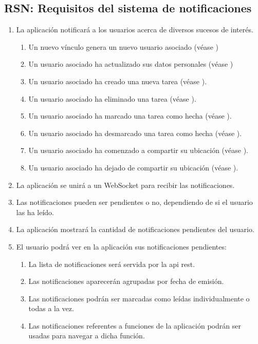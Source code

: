 \subsection{RSN: Requisitos del sistema de notificaciones}

\begin{enumerate}[label*=RSN \arabic*.]
    \item \label{req:notificaciones} La aplicación notificará a los usuarios acerca de diversos sucesos de interés.
    \begin{enumerate}[label*=\arabic*.]
        \item Un nuevo vínculo genera un nuevo usuario asociado (véase )
        \item Un usuario asociado ha actualizado sus datos personales (véase )
        \item Un usuario asociado ha creado una nueva tarea (véase ).
        \item Un usuario asociado ha eliminado una tarea (véase ).
        \item Un usuario asociado ha marcado una tarea como hecha (véase ).
        \item Un usuario asociado ha desmarcado una tarea como hecha (véase ).
        \item Un usuario asociado ha comenzado a compartir su ubicación (véase ).
        \item Un usuario asociado ha dejado de compartir su ubicación (véase ).
    \end{enumerate}
    \item La aplicación se unirá a un WebSocket para recibir las notificaciones.
    \item Las notificaciones pueden ser pendientes o no, dependiendo de si el usuario las ha leído.
    \item La aplicación mostrará la cantidad de notificaciones pendientes del usuario.
    \item \label{req:consultar_notificaciones} El usuario podrá ver en la aplicación sus notificaciones pendientes:
    \begin{enumerate}[label*=\arabic*.]
        \item La lista de notificaciones será servida por la \acrshort{api} \acrshort{rest}.
        \item Las notificaciones aparecerán agrupadas por fecha de emisión.
        \item \label{req:leer_notificaciones} Las notificaciones podrán ser marcadas como leídas individualmente o todas a la vez.
        \item Las notificaciones referentes a funciones de la aplicación podrán ser usadas para navegar a dicha función.
    \end{enumerate}
\end{enumerate}

